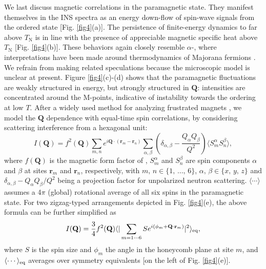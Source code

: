 \documentclass[%
reprint,
superscriptaddress,
amsmath,amssymb,
aps,
prb,
]{revtex4-2}
\begin{document}
We last discuss magnetic correlations in the paramagnetic state. They manifest themselves in the INS spectra as an energy down-flow of spin-wave signals from the ordered state [Fig. \ref{fig4}(a)]. The persistence of finite-energy dynamics to far above $T_\mathrm{N}$ is in line with the presence of appreciable magnetic specific heat above $T_\mathrm{N}$ [Fig. \ref{fig4}(b)]. These behaviors again closely resemble $\alpha$-, where interpretations have been made around thermodynamics of Majorana fermions \cite{DoNP2017,MotomeJPSJ2020}. We refrain from making related speculations because the microscopic model is unclear at present. Figure \ref{fig4}(c)-(d) shows that the paramagnetic fluctuations are weakly structured in energy, but strongly structured in $\mathbf{Q}$: intensities are concentrated around the M-points, indicative of instability towards the ordering at low $T$. After a widely used method for analyzing frustrated magnets \cite{LeeNature2002,TomiyasuPRL2008,TomiyasuPRB2011,TomiyasuPRB2011_2,JanasPRL2021}, we model the $\mathbf{Q}$ dependence with equal-time spin correlations, by considering scattering interference from a hexagonal unit:
	\begin{equation}
		I(\textbf{Q}) = f^2(\textbf{Q}) \sum_{m,n}e^{i\textbf{Q}\cdot(\textbf{r}_m-\textbf{r}_n)}\sum_{\alpha,\beta}(\delta_{\alpha,\beta}-\frac{Q_{\alpha}Q_{\beta}}{Q^2})\langle S_m^{\alpha}S_n^{\beta} \rangle,
	\end{equation}
where $f(\textbf{Q})$ is the magnetic form factor of , $S_m^{\alpha}$ and $S_n^{\beta}$ are spin components $\alpha$ and $\beta$ at sites $\textbf{r}_m$ and $\textbf{r}_n$, respectively, with $m,\,n \in \{1,\,\ldots,\,6\}$, $\alpha,\,\beta \in \{x,\,y,\,z\}$ and $\delta_{\alpha,\beta}-Q_{\alpha}Q_{\beta}/Q^2$ being a projection factor for unpolarized neutron scattering. $\langle \cdots \rangle$ assumes a 4$\pi$ (global) rotational average of all six spins in the paramagnetic state. For two zigzag-typed arrangements depicted in Fig. \ref{fig4}(e), the above formula can be further simplified as
	\begin{equation}
		I(\textbf{Q}) = \frac{3}{4} f^2(\textbf{Q}) \langle|\sum_{m = 1\dotsb 6} S  e^{i(\phi_m + \textbf{Q} \cdot \textbf{r}_m)}|^2\rangle_{\rm{eq}},
	\end{equation}
where $S$ is the spin size and $\phi_m$ the angle in the honeycomb plane at site $m$, and $\langle \cdots \rangle_{\rm{eq}}$ averages over symmetry equivalents [on the left of Fig. \ref{fig4}(e)].
\end{document}
